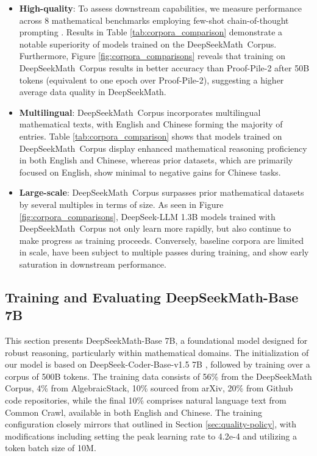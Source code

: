\begin{itemize}[topsep=0pt]
\begin{itemize}[topsep=0pt]
    \item \textbf{High-quality}: 
    To assess downstream capabilities, we measure performance across 8 mathematical benchmarks employing few-shot chain-of-thought prompting \cite{cot}. Results in Table \ref{tab:corpora_comparison} demonstrate a notable superiority of models trained on the DeepSeekMath~Corpus. Furthermore, Figure \ref{fig:corpora_comparisons} reveals that training on DeepSeekMath~Corpus results in better accuracy than Proof-Pile-2 after 50B tokens (equivalent to one epoch over Proof-Pile-2), suggesting a higher average data quality in DeepSeekMath.
    \item \textbf{Multilingual}:
    DeepSeekMath~Corpus incorporates multilingual mathematical texts, with English and Chinese forming the majority of entries. Table \ref{tab:corpora_comparison} shows that models trained on DeepSeekMath~Corpus display enhanced mathematical reasoning proficiency in both English and Chinese, whereas prior datasets, which are primarily focused on English, show minimal to negative gains for Chinese tasks.
    \item \textbf{Large-scale}: 
    DeepSeekMath~Corpus surpasses prior mathematical datasets by several multiples in terms of size. As seen in Figure \ref{fig:corpora_comparisons}, DeepSeek-LLM 1.3B models trained with DeepSeekMath~Corpus not only learn more rapidly, but also continue to make progress as training proceeds. Conversely, baseline corpora are limited in scale, have been subject to multiple passes during training, and show early saturation in downstream performance.
\end{itemize}

\subsection{Training and Evaluating DeepSeekMath-Base 7B}

This section presents DeepSeekMath-Base 7B, a foundational model designed for robust reasoning, particularly within mathematical domains. The initialization of our model is based on DeepSeek-Coder-Base-v1.5 7B \citep{deepseek-coder}, followed by training over a corpus of 500B tokens. The training data consists of 56\% from the DeepSeekMath Corpus, 4\% from AlgebraicStack, 10\% sourced from arXiv, 20\% from Github code repositories, while the final 10\% comprises natural language text from Common Crawl, available in both English and Chinese. The training configuration closely mirrors that outlined in Section \ref{sec:quality-policy}, with modifications including setting the peak learning rate to 4.2e-4 and utilizing a token batch size of 10M.


\end{itemize}
